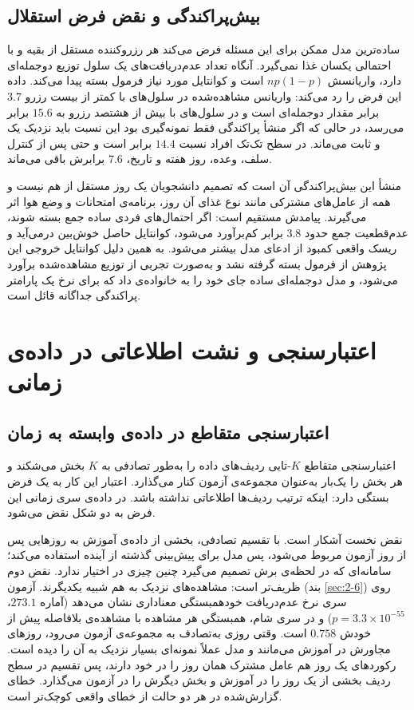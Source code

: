 \subsection{بیش‌پراکندگی و نقض فرض استقلال}
\label{sec:2-3-5}

ساده‌ترین مدل ممکن برای این مسئله فرض می‌کند هر رزروکننده مستقل از بقیه و با احتمالی
یکسان غذا نمی‌گیرد. آنگاه تعداد عدم‌دریافت‌های یک سلول توزیع دوجمله‌ای دارد، واریانسش
$np(1-p)$ است و کوانتایل مورد نیاز فرمول بسته پیدا می‌کند. داده این فرض را رد می‌کند:
واریانس مشاهده‌شده در سلول‌های با کمتر از بیست رزرو $3.7$ برابر مقدار دوجمله‌ای است و در
سلول‌های با بیش از هشتصد رزرو به $15.6$ برابر می‌رسد، در حالی که اگر منشأ پراکندگی فقط
نمونه‌گیری بود این نسبت باید نزدیک یک و ثابت می‌ماند. در سطح تک‌تک افراد نسبت $14.4$
برابر است و حتی پس از کنترل سلف، وعده، روز هفته و تاریخ، $7.6$ برابرش باقی می‌ماند.

منشأ این بیش‌پراکندگی آن است که تصمیم دانشجویان یک روز
مستقل از هم نیست و همه از عامل‌های مشترکی مانند نوع غذای آن روز، برنامه‌ی امتحانات و وضع
هوا اثر می‌گیرند. پیامدش مستقیم است: اگر احتمال‌های فردی ساده جمع بسته شوند، عدم‌قطعیت
جمع حدود $3.8$ برابر کم‌برآورد می‌شود، کوانتایل حاصل خوش‌بین درمی‌آید و ریسک واقعی کمبود
از ادعای مدل بیشتر می‌شود. به همین دلیل کوانتایل خروجی این پژوهش از فرمول بسته گرفته نشد
و به‌صورت تجربی از توزیع مشاهده‌شده برآورد می‌شود، و مدل دوجمله‌ای ساده جای خود را به
خانواده‌ی  داد که برای نرخ یک پارامتر پراکندگی جداگانه قائل است.

\section{اعتبارسنجی و نشت اطلاعاتی در داده‌ی زمانی}
\label{sec:2-4}

\subsection{اعتبارسنجی متقاطع در داده‌ی وابسته به زمان}
\label{sec:2-4-1}

اعتبارسنجی متقاطع $K$-تایی ردیف‌های داده را به‌طور
تصادفی به $K$ بخش می‌شکند و هر بخش را یک‌بار به‌عنوان مجموعه‌ی آزمون کنار می‌گذارد.
اعتبار این کار به یک فرض بستگی دارد: اینکه ترتیب ردیف‌ها اطلاعاتی نداشته باشد. در
داده‌ی سری زمانی این فرض به دو شکل نقض می‌شود.

نقض نخست آشکار است. با تقسیم تصادفی، بخشی از داده‌ی آموزش به روزهایی پس از روز آزمون
مربوط می‌شود، پس مدل برای پیش‌بینی گذشته از آینده استفاده می‌کند؛ سامانه‌ای که در لحظه‌ی
برش تصمیم می‌گیرد چنین چیزی در اختیار ندارد. نقض دوم ظریف‌تر است: مشاهده‌های نزدیک به
هم شبیه یکدیگرند. آزمون  (بند \ref{sec:2-6}) روی سری نرخ عدم‌دریافت
خودهمبستگی معناداری نشان می‌دهد (آماره $273.1$،
$p = 3.3\times10^{-55}$) و در سری شام، همبستگی هر مشاهده با مشاهده‌ی بلافاصله پیش از
خودش $0.758$ است. وقتی روزی به‌تصادف به مجموعه‌ی آزمون می‌رود، روزهای مجاورش در آموزش
می‌مانند و مدل عملاً نمونه‌ای بسیار نزدیک به آن را دیده است. رکوردهای یک روز هم عامل
مشترک همان روز را در خود دارند، پس تقسیم در سطح ردیف بخشی از یک روز را در آموزش و بخش
دیگرش را در آزمون می‌گذارد. خطای گزارش‌شده در هر دو حالت از خطای واقعی کوچک‌تر است.

